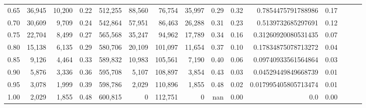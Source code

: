 \begin{tabular}{rrrrrrrrrrrrrrr}
0.65 &  36,945 &  10,200 &  0.22 &  512,255 &   88,560 &   76,754 &   35,997 &  0.29 &  0.32 &    0.7854475791788986 &      0.17 \\
0.70 &  30,609 &   9,709 &  0.24 &  542,864 &   57,951 &   86,463 &   26,288 &  0.31 &  0.23 &    0.5139732685297691 &      0.12 \\
0.75 &  22,704 &   8,499 &  0.27 &  565,568 &   35,247 &   94,962 &   17,789 &  0.34 &  0.16 &   0.31260920080531435 &      0.07 \\
0.80 &  15,138 &   6,135 &  0.29 &  580,706 &   20,109 &  101,097 &   11,654 &  0.37 &  0.10 &   0.17834875078713272 &      0.04 \\
0.85 &   9,126 &   4,464 &  0.33 &  589,832 &   10,983 &  105,561 &    7,190 &  0.40 &  0.06 &   0.09740933561564864 &      0.03 \\
0.90 &   5,876 &   3,336 &  0.36 &  595,708 &    5,107 &  108,897 &    3,854 &  0.43 &  0.03 &   0.04529449849668739 &      0.01 \\
0.95 &   3,078 &   1,999 &  0.39 &  598,786 &    2,029 &  110,896 &    1,855 &  0.48 &  0.02 &  0.017995405805713474 &      0.01 \\
1.00 &   2,029 &   1,855 &  0.48 &  600,815 &        0 &  112,751 &        0 &   nan &  0.00 &                   0.0 &      0.00 \\
\bottomrule
\end{tabular}

